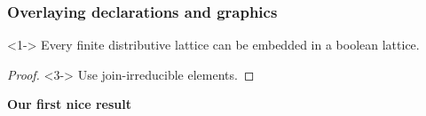 \documentclass{beamer}
\begin{document}
\begin{frame}
\frametitle{Overlaying declarations and graphics}

\begin{theorem}<1->
Every finite distributive lattice can be embedded in a boolean lattice.
\end{theorem}
\begin{proof}<3->
Use join-irreducible elements.
\end{proof}
\textbf<2->{Our first nice result}
\end{frame}
\end{document}
